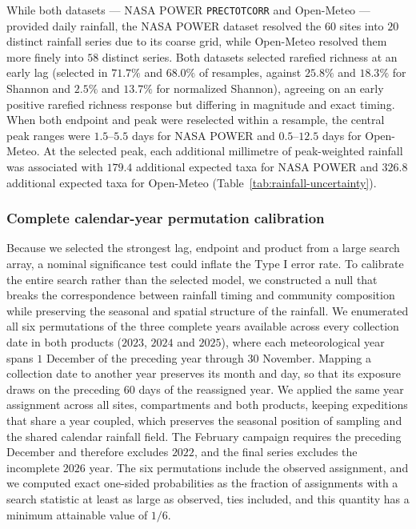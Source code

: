 \documentclass[11pt]{article}
\begin{document}
While both datasets --- NASA POWER \texttt{PRECTOTCORR} and Open-Meteo --- provided daily rainfall, the NASA POWER dataset resolved the $60$ sites into $20$ distinct rainfall series due to its coarse grid, while Open-Meteo resolved them more finely into $58$ distinct series. Both datasets selected rarefied richness at an early lag (selected in $71.7\%$ and $68.0\%$ of resamples, against $25.8\%$ and $18.3\%$ for Shannon and $2.5\%$ and $13.7\%$ for normalized Shannon), agreeing on an early positive rarefied richness response but differing in magnitude and exact timing. When both endpoint and peak were reselected within a resample, the central peak ranges were $1.5$--$5.5$ days for NASA POWER and $0.5$--$12.5$ days for Open-Meteo. At the selected peak, each additional millimetre of peak-weighted rainfall was associated with $179.4$ additional expected taxa for NASA POWER and $326.8$ additional expected taxa for Open-Meteo (Table~\ref{tab:rainfall-uncertainty}).


\subsubsection{Complete calendar-year permutation calibration}
\label{sup:rainfall_calendaryear}
Because we selected the strongest lag, endpoint and product from a large search array, a nominal significance test could inflate the Type I error rate. To calibrate the entire search rather than the selected model, we constructed a null that breaks the correspondence between rainfall timing and community composition while preserving the seasonal and spatial structure of the rainfall. We enumerated all six permutations of the three complete years available across every collection date in both products ($2023$, $2024$ and $2025$), where each meteorological year spans $1$ December of the preceding year through $30$ November. Mapping a collection date to another year preserves its month and day, so that its exposure draws on the preceding $60$ days of the reassigned year. We applied the same year assignment across all sites, compartments and both products, keeping expeditions that share a year coupled, which preserves the seasonal position of sampling and the shared calendar rainfall field. The February campaign requires the preceding December and therefore excludes $2022$, and the final series excludes the incomplete $2026$ year. The six permutations include the observed assignment, and we computed exact one-sided probabilities as the fraction of assignments with a search statistic at least as large as observed, ties included, and this quantity has a minimum attainable value of $1/6$.
\end{document}
